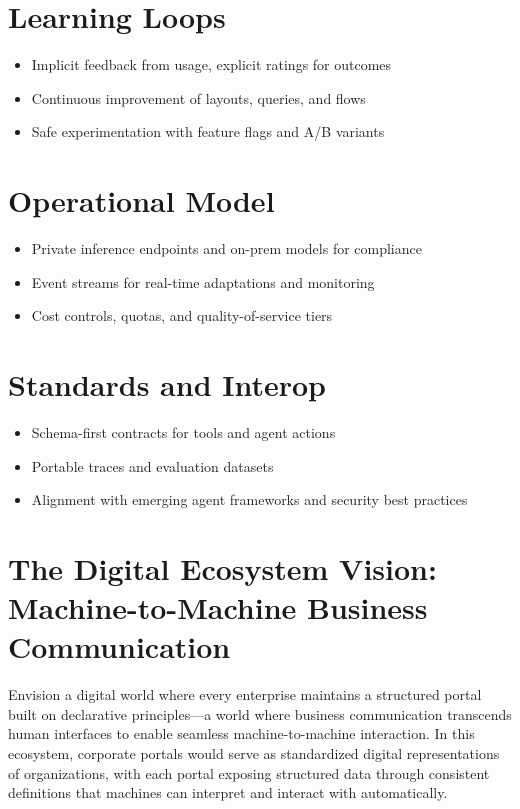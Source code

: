 \section{Learning Loops}
\begin{itemize}
	\item Implicit feedback from usage, explicit ratings for outcomes
	\item Continuous improvement of layouts, queries, and flows
	\item Safe experimentation with feature flags and A/B variants
\end{itemize}

\section{Operational Model}
\begin{itemize}
	\item Private inference endpoints and on-prem models for compliance
	\item Event streams for real-time adaptations and monitoring
	\item Cost controls, quotas, and quality-of-service tiers
\end{itemize}

\section{Standards and Interop}
\begin{itemize}
	\item Schema-first contracts for tools and agent actions
	\item Portable traces and evaluation datasets
	\item Alignment with emerging agent frameworks and security best practices
\end{itemize}

\section{The Digital Ecosystem Vision: Machine-to-Machine Business Communication}
\label{sec:digital-ecosystem-vision}

Envision a digital world where every enterprise maintains a structured portal built on declarative principles—a world where business communication transcends human interfaces to enable seamless machine-to-machine interaction. In this ecosystem, corporate portals would serve as standardized digital representations of organizations, with each portal exposing structured data through consistent \wbol{} definitions that machines can interpret and interact with automatically.

